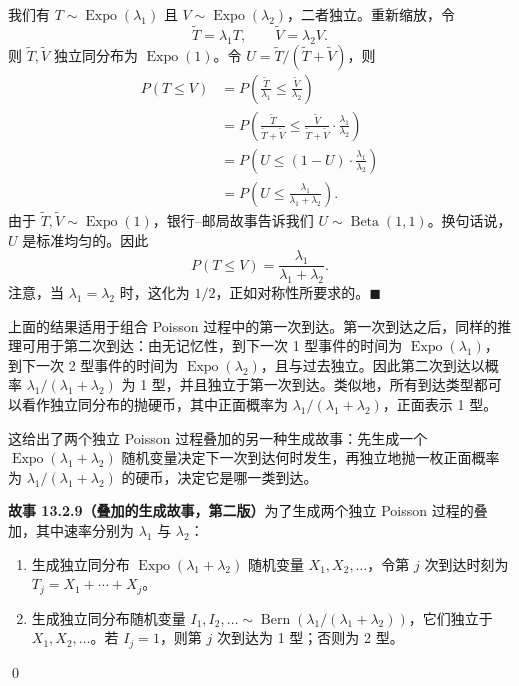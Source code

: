 \documentclass[UTF8, 12pt, fontset=fandol, oneside]{ctexart}
\begin{document}
我们有 $T\sim\operatorname{Expo}(\lambda_1)$ 且 $V\sim\operatorname{Expo}(\lambda_2)$，二者独立。重新缩放，令
\[
  \tilde T=\lambda_1T,\qquad \tilde V=\lambda_2V.
\]
则 $\tilde T,\tilde V$ 独立同分布为 $\operatorname{Expo}(1)$。令 $U=\tilde T/(\tilde T+\tilde V)$，则
\[
\begin{aligned}
  P(T\le V)
  &=P\left(\frac{\tilde T}{\lambda_1}\le \frac{\tilde V}{\lambda_2}\right)\\
  &=P\left(\frac{\tilde T}{\tilde T+\tilde V}
    \le
    \frac{\tilde V}{\tilde T+\tilde V}\cdot\frac{\lambda_1}{\lambda_2}\right)\\
  &=P\left(U\le (1-U)\cdot\frac{\lambda_1}{\lambda_2}\right)\\
  &=P\left(U\le \frac{\lambda_1}{\lambda_1+\lambda_2}\right).
\end{aligned}
\]
由于 $\tilde T,\tilde V\sim\operatorname{Expo}(1)$，银行--邮局故事告诉我们 $U\sim\operatorname{Beta}(1,1)$。换句话说，$U$ 是标准均匀的。因此
\[
  P(T\le V)=\frac{\lambda_1}{\lambda_1+\lambda_2}.
\]
注意，当 $\lambda_1=\lambda_2$ 时，这化为 $1/2$，正如对称性所要求的。$\blacksquare$

上面的结果适用于组合 Poisson 过程中的第一次到达。第一次到达之后，同样的推理可用于第二次到达：由无记忆性，到下一次 1 型事件的时间为 $\operatorname{Expo}(\lambda_1)$，到下一次 2 型事件的时间为 $\operatorname{Expo}(\lambda_2)$，且与过去独立。因此第二次到达以概率 $\lambda_1/(\lambda_1+\lambda_2)$ 为 1 型，并且独立于第一次到达。类似地，所有到达类型都可以看作独立同分布的抛硬币，其中正面概率为 $\lambda_1/(\lambda_1+\lambda_2)$，正面表示 1 型。

这给出了两个独立 Poisson 过程叠加的另一种生成故事：先生成一个 $\operatorname{Expo}(\lambda_1+\lambda_2)$ 随机变量决定下一次到达何时发生，再独立地抛一枚正面概率为 $\lambda_1/(\lambda_1+\lambda_2)$ 的硬币，决定它是哪一类到达。

\noindent\textbf{故事 13.2.9（叠加的生成故事，第二版）}\quad 为了生成两个独立 Poisson 过程的叠加，其中速率分别为 $\lambda_1$ 与 $\lambda_2$：
\begin{enumerate}
  \item 生成独立同分布 $\operatorname{Expo}(\lambda_1+\lambda_2)$ 随机变量 $X_1,X_2,\ldots$，令第 $j$ 次到达时刻为 $T_j=X_1+\cdots+X_j$。
  \item 生成独立同分布随机变量 $I_1,I_2,\ldots\sim\operatorname{Bern}(\lambda_1/(\lambda_1+\lambda_2))$，它们独立于 $X_1,X_2,\ldots$。若 $I_j=1$，则第 $j$ 次到达为 1 型；否则为 2 型。
\end{enumerate}
\qed
\end{document}
